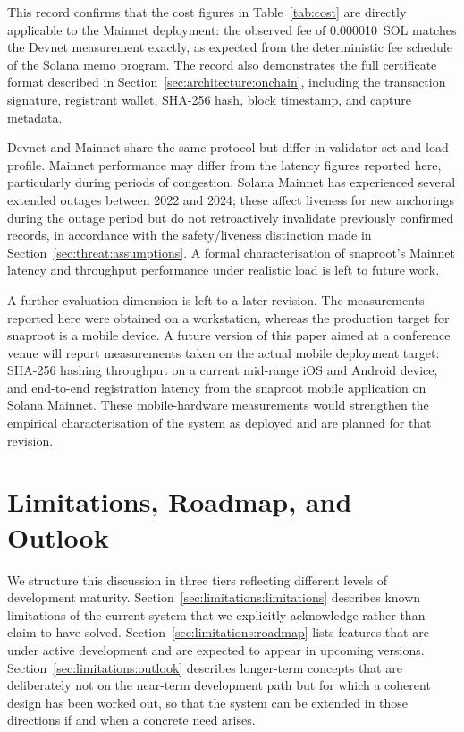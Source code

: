 \documentclass[11pt,a4paper]{article}
\begin{document}
This record confirms that the cost figures in Table~\ref{tab:cost} are
directly applicable to the Mainnet deployment: the observed fee of
0.000010~SOL matches the Devnet measurement exactly, as expected from
the deterministic fee schedule of the Solana memo program. The record
also demonstrates the full certificate format described in
Section~\ref{sec:architecture:onchain}, including the transaction
signature, registrant wallet, SHA-256 hash, block timestamp, and
capture metadata.

Devnet and Mainnet share the same protocol but differ in validator
set and load profile. Mainnet performance may differ from the latency
figures reported here, particularly during periods of congestion.
Solana Mainnet has experienced several extended outages between 2022
and 2024; these affect liveness for new anchorings during the outage
period but do not retroactively invalidate previously confirmed
records, in accordance with the safety/liveness distinction made in
Section~\ref{sec:threat:assumptions}. A formal characterisation of
snaproot's Mainnet latency and throughput performance under realistic
load is left to future work.

A further evaluation dimension is left to a later revision. The
measurements reported here were obtained on a workstation, whereas the
production target for snaproot is a mobile device. A future version of
this paper aimed at a conference venue will report measurements taken
on the actual mobile deployment target: SHA-256 hashing throughput on
a current mid-range iOS and Android device, and end-to-end registration
latency from the snaproot mobile application on Solana Mainnet. These
mobile-hardware measurements would strengthen the empirical
characterisation of the system as deployed and are planned for that
revision.


\clearpage

\section{Limitations, Roadmap, and Outlook}
\label{sec:limitations}

We structure this discussion in three tiers reflecting different levels
of development maturity. Section~\ref{sec:limitations:limitations}
describes known limitations of the current system that we explicitly
acknowledge rather than claim to have solved. Section~\ref{sec:limitations:roadmap}
lists features that are under active development and are expected to
appear in upcoming versions. Section~\ref{sec:limitations:outlook}
describes longer-term concepts that are deliberately not on the
near-term development path but for which a coherent design has been
worked out, so that the system can be extended in those directions if
and when a concrete need arises.
\end{document}
